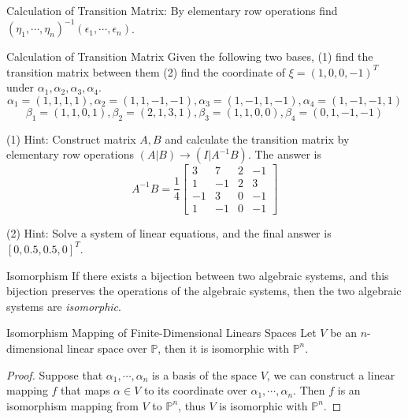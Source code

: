 \begin{note}{}
  Calculation of Transition Matrix:
  By elementary row operations find $(\eta_1, \cdots, \eta_n)^{-1} (\epsilon_1,
  \cdots, \epsilon_n)$.
\end{note}

\begin{example}{Calculation of Transition Matrix}{}
  Given the following two bases, (1) find the transition matrix between them
  (2) find the coordinate of $\xi = (1, 0, 0, -1)^T$ under $\alpha_1, \alpha_2,
  \alpha_3, \alpha_4$.
  \begin{equation}
    \alpha_1=(1,1,1,1),\alpha_2=(1,1,-1,-1),\alpha_3=(1,-1,1,-1),\alpha_4=(1,-1,-1,1)
  \end{equation}
  \begin{equation}
    \beta_1=(1,1,0,1),\beta_2=(2,1,3,1),\beta_3=(1,1,0,0),\beta_4=(0,1,-1,-1)
  \end{equation}
\end{example}

\begin{solution}
  (1) Hint: Construct matrix $A, B$ and calculate the transition matrix by
  elementary row operations $(A|B) \rightarrow (I|A^{-1}B)$. The answer is
  \begin{equation}
    A^{-1}B=\frac{1}{4}\left[\begin{array}{cccc}3&7&2&-1\\1&-1&2&3\\-1&3&0&-1\\1&-1&0&-1\end{array}\right]
  \end{equation}

  (2) Hint: Solve a system of linear equations, and the final answer is $[0,
  0.5, 0.5, 0]^T$.
\end{solution}

\begin{definition}{Isomorphism}{}
  If there exists a bijection between two algebraic systems,
  and this bijection preserves the operations of the algebraic systems,
  then the two algebraic systems are \emph{isomorphic}.
\end{definition}

\begin{theorem}{Isomorphism Mapping of Finite-Dimensional Linears Spaces}{}
  Let $V$ be an $n$-dimensional linear space over $\mathbb{P}$,
  then it is isomorphic with $\mathbb{P}^n$.
\end{theorem}

\begin{proof}
  Suppose that $\alpha_1, \cdots, \alpha_n$ is a basis of the space $V$,
  we can construct a linear mapping $f$ that maps $\alpha \in V$ to
  its coordinate over $\alpha_1, \cdots, \alpha_n$.
  Then $f$ is an isomorphism mapping from $V$ to $\mathbb{P}^n$,
  thus $V$ is isomorphic with $\mathbb{P}^n$.
\end{proof}


